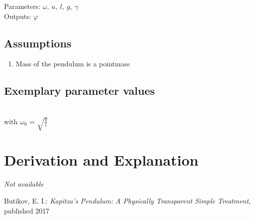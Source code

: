 \documentclass[10pt,a4paper]{article}
\begin{document}
	\noindent
	Parameters: $\omega, ~a, ~l, ~g, ~\gamma$ %
	\\
	Outputs: $\varphi$ %
	
	
	\subsection{Assumptions} %
		\begin{enumerate} %
			\item Mass of the pendulum is a pointmass 
		\end{enumerate}
	
	
	\subsection{Exemplary parameter values}
	
	\\
	with $\omega_0$ = $\sqrt{\frac{g}{l}}$

	
	\section{Derivation and Explanation} %
	
	\textit{Not available}
	
	
	\begin{thebibliography}{10}		
		Butikov, E. I.: 
		\textit{Kapitza’s Pendulum: A Physically Transparent Simple Treatment}, published 2017
	\end{thebibliography}
\end{document}
